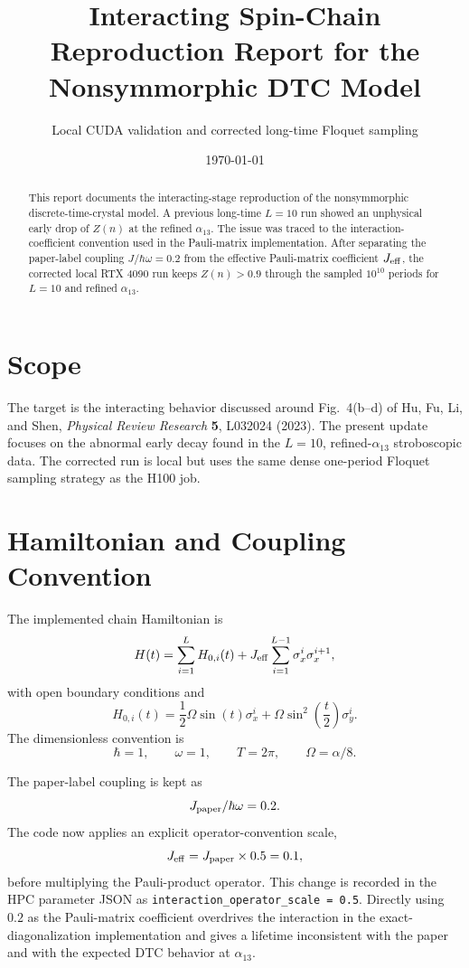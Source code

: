 \documentclass[11pt,a4paper]{article}
\title{Interacting Spin-Chain Reproduction Report for the Nonsymmorphic DTC Model}
\author{Local CUDA validation and corrected long-time Floquet sampling}
\date{\today}
\begin{document}
\maketitle

\begin{abstract}
This report documents the interacting-stage reproduction of the nonsymmorphic discrete-time-crystal model. A previous long-time \(L=10\) run showed an unphysical early drop of \(Z(n)\) at the refined \(\alpha_{13}\). The issue was traced to the interaction-coefficient convention used in the Pauli-matrix implementation. After separating the paper-label coupling \(J/\hbar\omega=0.2\) from the effective Pauli-matrix coefficient \(J_{\rm eff}\), the corrected local RTX 4090 run keeps \(Z(n)>0.9\) through the sampled \(10^{10}\) periods for \(L=10\) and refined \(\alpha_{13}\).
\end{abstract}

\section{Scope}

The target is the interacting behavior discussed around Fig.~4(b--d) of Hu, Fu, Li, and Shen, \emph{Physical Review Research} \textbf{5}, L032024 (2023). The present update focuses on the abnormal early decay found in the \(L=10\), refined-\(\alpha_{13}\) stroboscopic data. The corrected run is local but uses the same dense one-period Floquet sampling strategy as the H100 job.

\section{Hamiltonian and Coupling Convention}

The implemented chain Hamiltonian is
\begin{equation}
H(t)=\sum_{i=1}^{L}H_{0,i}(t)
 + J_{\rm eff}\sum_{i=1}^{L-1}\sigma_x^i\sigma_x^{i+1},
\label{eq:interacting-h}
\end{equation}
with open boundary conditions and
\begin{equation}
H_{0,i}(t)
=\frac{1}{2}\Omega\sin(t)\sigma_x^i
 +\Omega\sin^2\left(\frac{t}{2}\right)\sigma_y^i.
\end{equation}
The dimensionless convention is
\[
\hbar=1,\qquad \omega=1,\qquad T=2\pi,\qquad \Omega=\alpha/8.
\]

The paper-label coupling is kept as
\[
J_{\rm paper}/\hbar\omega=0.2.
\]
The code now applies an explicit operator-convention scale,
\[
J_{\rm eff}=J_{\rm paper}\times 0.5=0.1,
\]
before multiplying the Pauli-product operator. This change is recorded in
the HPC parameter JSON as \texttt{interaction\_operator\_scale = 0.5}. Directly using \(0.2\) as the Pauli-matrix coefficient overdrives the interaction in the exact-diagonalization implementation and gives a lifetime inconsistent with the paper and with the expected DTC behavior at \(\alpha_{13}\).
\end{document}
